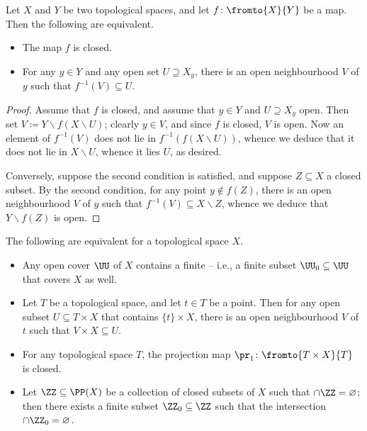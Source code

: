 \begin{prp}
	Let $X$ and $Y$ be two topological spaces, and
	let $f\colon\fromto{X}{Y}$ be a map.
	Then the following are equivalent.
	\begin{itemize}
		\item The map $f$ is closed.
		\item For any $y\in Y$ and any open set $U\supseteq X_y$,
			there is an open neighbourhood $V$ of $y$ such that $f^{-1}(V)\subseteq U$.
	\end{itemize}
\end{prp}

\begin{proof}
	Assume that $f$ is closed, and
	assume that $y\in Y$ and $U\supseteq X_y$ open.
	Then set $V\coloneq Y \smallsetminus f(X \smallsetminus U)$;
	clearly $y\in V$, and since $f$ is closed, $V$ is open.
	Now an element of $f^{-1}(V)$ does not lie in $f^{-1}(f(X \smallsetminus U))$, whence
	we deduce that it does not lie in $X \smallsetminus U$, whence it lies $U$, as desired.

	Conversely, suppose the second condition is satisfied, and
	suppose $Z\subseteq X$ a closed subset.
	By the second condition, for any point $y\notin f(Z)$, there is an open neighbourhood $V$ of $y$ such that $f^{-1}(V)\subseteq X \smallsetminus Z$, whence we deduce that $Y \smallsetminus f(Z)$ is open.
\end{proof}

\begin{prp}\label{prp:compactness}
	The following are equivalent for a topological space $X$.
	\begin{itemize}
		\item Any open cover $\UU$ of $X$ contains a finite  --
			i.e., a finite subset $\UU_0\subseteq\UU$ that covers $X$ as well.
		\item Let $T$ be a topological space, and let $t\in T$ be a point.
			Then for any open subset $U\subseteq T\times X$ that contains $\{t\}\times X$, there is an open neighbourhood $V$ of $t$ such that $V\times X\subseteq U$.
		\item For any topological space $T$, the projection map $\pr_1\colon\fromto{T\times X}{T}$ is closed.
		\item Let $\ZZ\subseteq\PP(X)$ be a collection of closed subsets of $X$ such that $\cap\ZZ=\varnothing$;
			then there exists a finite subset $\ZZ_0\subseteq\ZZ$ such that the intersection $\cap\ZZ_0=\varnothing$.
	\end{itemize}
\end{prp}

